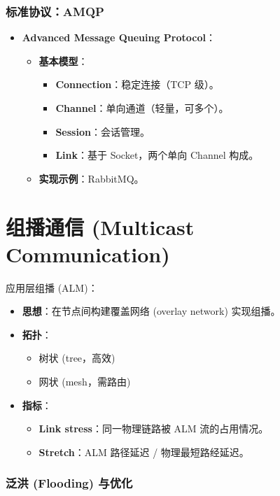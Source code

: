 \subsubsection{标准协议：AMQP}

\begin{itemize}
\item \textbf{Advanced Message Queuing Protocol}：
  \begin{itemize}
  \item \textbf{基本模型}：
    \begin{itemize}
    \item \textbf{Connection}：稳定连接（TCP 级）。
    \item \textbf{Channel}：单向通道（轻量，可多个）。
    \item \textbf{Session}：会话管理。
    \item \textbf{Link}：基于 Socket，两个单向 Channel 构成。
    \end{itemize}
  \item \textbf{实现示例}：RabbitMQ。
  \end{itemize}
\end{itemize}

\section{组播通信 (Multicast Communication)}

应用层组播 (ALM)：
\begin{itemize}
\item \textbf{思想}：在节点间构建覆盖网络 (overlay network) 实现组播。
\item \textbf{拓扑}：
  \begin{itemize}
  \item 树状 (tree，高效)
  \item 网状 (mesh，需路由)
  \end{itemize}
\item \textbf{指标}：
  \begin{itemize}
  \item \textbf{Link stress}：同一物理链路被 ALM 流的占用情况。
  \item \textbf{Stretch}：ALM 路径延迟 / 物理最短路经延迟。
  \end{itemize}
\end{itemize}

\subsubsection{泛洪 (Flooding) 与优化}

